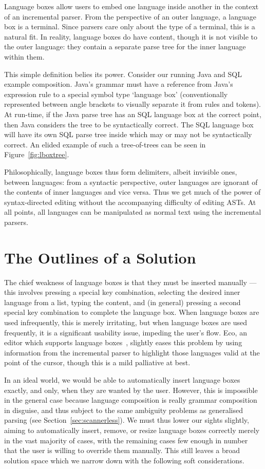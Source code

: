 \documentclass[sigplan,screen]{acmart}
\begin{document}
Language boxes allow users to embed one language inside another in the
context of an incremental parser. From the perspective of an outer language, a
language box is a terminal. Since
parsers care only about the type of a terminal, this is a natural fit. In
reality, language boxes do have content, though it is not visible to the outer
language: they contain a separate parse tree for the inner language within
them.

This simple definition belies its power. Consider our running Java and
SQL example composition. Java's grammar must have a reference from Java's
expression rule to a special symbol type `language box' (conventionally
represented between angle brackets to visually separate it from rules and
tokens). At run-time, if the Java parse tree has an SQL language box at the
correct point, then Java considers the tree to be syntactically correct. The
SQL language box will have its own SQL parse tree inside which may or may not
be syntactically correct. An elided example of such a tree-of-trees can be seen
in Figure~\ref{fig:lboxtree}.

Philosophically, language boxes thus form delimiters, albeit invisible
ones, between languages: from a syntactic perspective, outer languages are
ignorant of the contents of inner languages and vice versa. Thus we get much of
the power of syntax-directed editing without the accompanying difficulty of
editing ASTs. At all points, all languages can be manipulated as normal text
using the incremental parsers.


\section{The Outlines of a Solution}

\label{the problem}
The chief weakness of language boxes is that they must be inserted
manually --- this involves pressing a special key combination,
selecting the desired inner language from a list, typing the content, and (in
general) pressing a second special key combination to complete the language box.
When language boxes are used infrequently, this is merely irritating,
but when language boxes are used frequently, it is a significant usability
issue, impeding the user's flow. Eco, an editor which supports language boxes~\cite{diekmann14eco},
slightly eases this problem by using information from the incremental parser to
highlight those languages valid at the point of the cursor,
though this is a mild palliative at best.

In an ideal world, we would be able to automatically insert language boxes exactly, and only,
when they are wanted by the user. However, this is impossible in the
general case because language composition is really grammar composition
in disguise, and thus subject to the same ambiguity problems as generalised
parsing (see Section~\ref{sec:scannerless}). We must thus lower our sights
slightly, aiming to automatically insert, remove, or resize language boxes
correctly merely in the vast majority of cases, with the remaining cases
few enough in number that the user is willing to override them manually.
This still leaves a broad solution space which we narrow down with the
following soft considerations.
\end{document}
